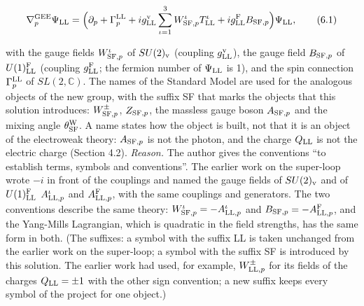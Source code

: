 \documentclass[
  10pt,
]{article}
\begin{document}
\[\nabla^{\rm GEE}_p\Psi_{\rm LL}=\Big(\partial_p+\Gamma^{\rm LL}_p+ig^{\rm v}_{\rm LL}\sum_{\iota=1}^3W^\iota_{{\rm SF},p}T^\iota_{\rm LL}+ig^{\rm F}_{\rm LL}B_{{\rm SF},p}\Big)\Psi_{\rm LL},\tag{6.1}\]

with the gauge fields \(W^\iota_{{\rm SF},p}\) of \(SU(2)_{\rm v}\)
(coupling \(g^{\rm v}_{\rm LL}\)), the gauge field \(B_{{\rm SF},p}\) of
\(U(1)^{\rm F}_{\rm LL}\) (coupling \(g^{\rm F}_{\rm LL}\); the fermion
number of \(\Psi_{\rm LL}\) is 1), and the spin connection
\(\Gamma^{\rm LL}_p\) of \(SL(2,\mathbb C)\). The names of the Standard
Model are used for the analogous objects of the new group, with the
suffix SF that marks the objects that this solution introduces:
\(W^\pm_{{\rm SF},p}\), \(Z_{{\rm SF},p}\), the massless gauge boson
\(A_{{\rm SF},p}\) and the mixing angle \(\theta^{\rm W}_{\rm SF}\). A
name states how the object is built, not that it is an object of the
electroweak theory: \(A_{{\rm SF},p}\) is not the photon, and the charge
\(Q_{\rm LL}\) is not the electric charge (Section 4.2). \emph{Reason.}
The author gives the conventions ``to establish terms, symbols and
conventions''. The earlier work on the super-loop wrote \(-i\) in front
of the couplings and named the gauge fields of \(SU(2)_{\rm v}\) and of
\(U(1)^{\rm F}_{\rm LL}\) \(A^\iota_{{\rm LL},p}\) and
\(A^{\rm F}_{{\rm LL},p}\), with the same couplings and generators. The
two conventions describe the same theory:
\(W^\iota_{{\rm SF},p}=-A^\iota_{{\rm LL},p}\) and
\(B_{{\rm SF},p}=-A^{\rm F}_{{\rm LL},p}\), and the Yang-Mills
Lagrangian, which is quadratic in the field strengths, has the same form
in both. (The suffixes: a symbol with the suffix LL is taken unchanged
from the earlier work on the super-loop; a symbol with the suffix SF is
introduced by this solution. The earlier work had used, for example,
\(W^\pm_{{\rm LL},p}\) for its fields of the charges \(Q_{\rm LL}=\pm1\)
with the other sign convention; a new suffix keeps every symbol of the
project for one object.)
\end{document}
